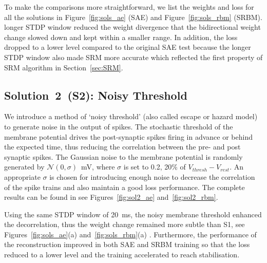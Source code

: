 To make the comparisons more straightforward, we list the weights and loss \protect{} \protect{} for all the solutions in Figure~\ref{fig:sols_ae} (SAE) and Figure~\ref{fig:sols_rbm} (SRBM).
\protect{}
\protect{} longer STDP window reduced the weight divergence that the bidirectional weight change slowed down and kept within a smaller range.
In addition, the loss dropped to a lower level compared to the original SAE test because the longer STDP window \protect{} \protect{} also made \protect{} SRM more accurate which reflected \protect{} the first property of \protect{} SRM algorithm in Section~\ref{sec:SRM}.



\subsection{Solution~2~(S2): Noisy Threshold}
We introduce a method of `noisy threshold' (also called escape or hazard model)~\citep{gerstner2002spiking} to generate noise in the output of spikes.
The stochastic threshold of the membrane potential drives the post-synaptic spikes firing in advance or behind the expected time, thus reducing the correlation between the pre- and post synaptic spikes.
The Gaussian noise \protect{} \protect{} to the membrane potential is randomly generated by $\mathcal{N}(0, \sigma)$~mV, where $\sigma$ is set to 0.2, 20\% of $V_{thresh} - V_{rest}.$
An appropriate $\sigma$ is chosen for introducing enough noise to decrease the correlation of the spike trains and also maintain a good loss performance.
The complete \protect{} \protect{} results can be found in \protect{} \protect{} see Figures~\ref{fig:sol2_ae} and~\ref{fig:sol2_rbm}.

Using the same STDP window \protect{} \protect{} of 20~ms, the noisy membrane threshold enhanced the decorrelation, thus the weight change remained more subtle than S1, see Figures~\ref{fig:sols_ae}(a) and~\ref{fig:sols_rbm}(a) .
Furthermore, the performance of the reconstruction improved in both SAE and SRBM training so that the loss reduced to a lower level and the training accelerated to reach stabilisation. 

